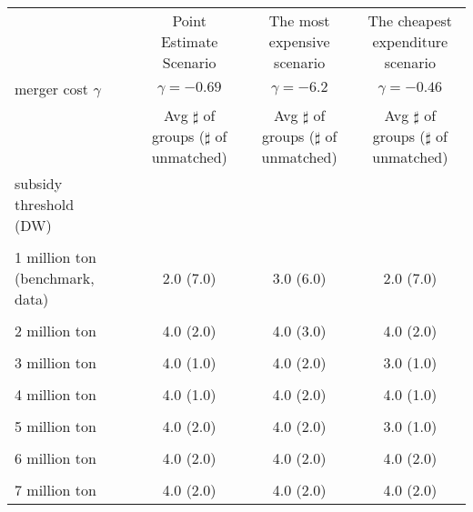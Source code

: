 \begin{tabular}{@{\extracolsep{5pt}}lcccc}
\toprule 
 &  & Point Estimate Scenario & The most expensive scenario & The cheapest expenditure scenario \\
merger cost $\gamma$ &  & $\gamma=-0.69$ & $\gamma=-6.2$ & $\gamma=-0.46$ \\
 &  & Avg $\sharp$ of groups ($\sharp$ of unmatched) & Avg $\sharp$ of groups ($\sharp$ of unmatched) & Avg $\sharp$ of groups ($\sharp$ of unmatched) \\
\midrule 
subsidy threshold (DW) &  &  &  &  \\
 &  &  &  &  \\
1 million ton (benchmark, data) &  & 2.0 (7.0) & 3.0 (6.0) & 2.0 (7.0) \\
 &  &  &  &  \\
2 million ton &  & 4.0 (2.0) & 4.0 (3.0) & 4.0 (2.0) \\
 &  &  &  &  \\
3 million ton &  & 4.0 (1.0) & 4.0 (2.0) & 3.0 (1.0) \\
 &  &  &  &  \\
4 million ton &  & 4.0 (1.0) & 4.0 (2.0) & 4.0 (1.0) \\
 &  &  &  &  \\
5 million ton &  & 4.0 (2.0) & 4.0 (2.0) & 3.0 (1.0) \\
 &  &  &  &  \\
6 million ton &  & 4.0 (2.0) & 4.0 (2.0) & 4.0 (2.0) \\
 &  &  &  &  \\
7 million ton &  & 4.0 (2.0) & 4.0 (2.0) & 4.0 (2.0) \\
\hline 
\bottomrule 
\end{tabular}
